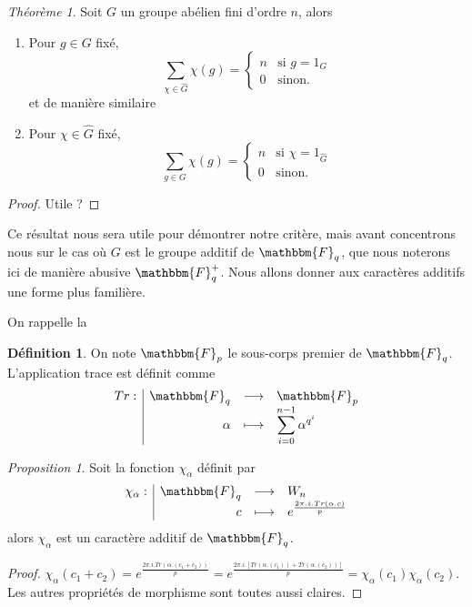 \documentclass[12pt]{article}
\newcommand{\fonction}[5]{
\begin{displaymath}
\begin{array}{l|rcl}
\displaystyle
#1 : & #2 & \longrightarrow & #3 \\
    & #4 & \longmapsto & #5
\end{array}
\end{displaymath}
}
\theoremstyle{remark}\newtheorem{note}{Note}
\theoremstyle{remark}\newtheorem{nota}{Notation}
\newcommand{\Fq}{\mathbbm{F}_q}
\newcommand{\Fp}{\mathbbm{F}_p}
\newtheorem{theorem}{Théorème}
\newtheorem{prop}{Proposition}
\theoremstyle{definition}
\newtheorem{definition}{Définition}
\begin{document}
\begin{theorem}
Soit $G$ un groupe abélien fini d'ordre $n$, alors
	\begin{enumerate}[label = \roman*)]
		\item Pour $g \in G$ fixé,   
				$$
				\displaystyle\sum_{\chi \in \hat{G}} \chi(g) = \left\{
				    \begin{array}{ll}
				        n & \mbox{si } g = 1_G \\
				        0 & \mbox{sinon.}
				    \end{array}
				\right.
				$$
et de manière similaire
		\item Pour $\chi \in \hat{G}$ fixé,
				$$
				\displaystyle\sum_{g \in G} \chi(g) = \left\{
				    \begin{array}{ll}
				        n & \mbox{si } \chi = 1_{\hat{G}} \\
				        0 & \mbox{sinon.}
				    \end{array}
				\right.
				$$						
	\end{enumerate}
\end{theorem}

\begin{proof}
Utile ?
\end{proof}

Ce résultat nous sera utile pour démontrer notre critère, mais avant concentrons nous sur le cas où $G$ est le groupe additif de $\Fq$, que nous noterons ici de manière abusive $\Fq^{+}$. Nous allons donner aux caractères additifs une forme plus familière.

\pagebreak

On rappelle la 

\begin{definition}
On note $\Fp$ le sous-corps premier de $\Fq$. L'application trace est définit comme \fonction{Tr}{\Fq}{\Fp}{\alpha}{\displaystyle\sum_{i=0}^{n-1} \alpha^{q^i}}
\end{definition}

\begin{prop}
Soit la fonction $\chi_\alpha$ définit par \fonction{\chi_\alpha}{\Fq}{W_n}{c}{e^{\frac{2\pi.i.Tr(\alpha.c)}{p}}} alors $\chi_\alpha$ est un caractère additif de $\Fq$.
\end{prop}

\begin{proof}
$\chi_\alpha(c_1 + c_2) = e^{\frac{2\pi.i.Tr(\alpha.(c_1 + c_2))}{p}} = e^{\frac{2\pi.i.[Tr(\alpha.(c_1))+Tr(\alpha.(c_2))]}{p}}=\chi_\alpha(c_1)\chi_\alpha(c_2)$. Les autres propriétés de morphisme sont toutes aussi claires.
\end{proof}
\end{document}
